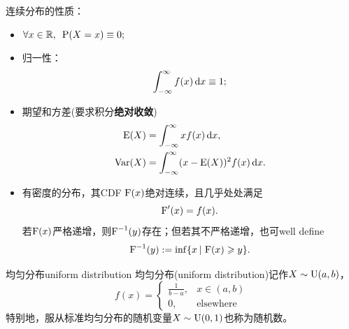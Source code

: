\begin{corollary}
	连续分布的性质：
	\begin{itemize}
		\item $\forall x \in \mathbb{R},\enspace\operatorname{P}(X = x) \equiv 0;$
		\item 归一性：
			\begin{equation}
				\int_{-\infty}^\infty f(x)\mathop{}\!\mathrm{d} x \equiv 1;
			\end{equation}
		\item 期望和方差(要求积分\textbf{绝对收敛})
			\begin{subequations}
				\begin{align}
					\operatorname{E}(X) &= \int_{-\infty}^\infty xf(x)\mathop{}\!\mathrm{d} x,\\
					\operatorname{Var}(X) &= \int_{-\infty}^\infty(x - \operatorname{E}(X))^2f(x)\mathop{}\!\mathrm{d} x.
				\end{align}
			\end{subequations}
		\item 有密度的分布，其CDF $\operatorname{F}(x)$绝对连续，且几乎处处满足
			\begin{equation}
				\operatorname{F}'(x) = f(x).
			\end{equation}
			若$\operatorname{F}(x)$严格递增，则$\operatorname{F}^{-1}(y)$存在；但若其不严格递增，也可well define
			\begin{equation}
				\label{eqn:CDF-1}
				\operatorname{F}^{-1}(y) := \inf\{x\,\vert\,\operatorname{F}(x) \geqslant y\}.
			\end{equation}
	\end{itemize}
\end{corollary}

\begin{definition}{均匀分布}{uniform distribution}
	均匀分布(uniform distribution)记作$X \sim \operatorname{U}(a,b)$，%
	\begin{equation}
		f(x) = \begin{cases}
			\frac1{b - a},&x \in (a,b)\\
			0,&\text{elsewhere}
		\end{cases}
	\end{equation}
	特别地，服从标准均匀分布的随机变量$X \sim \operatorname{U}(0,1)$也称为随机数。
\end{definition}
